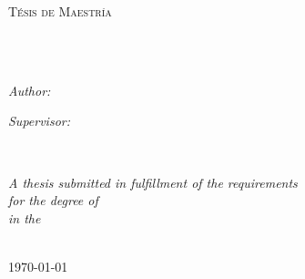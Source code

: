 \documentclass[
12pt, %
english, %
singlespacing, %
headsepline, %
]{MastersDoctoralThesis} %
\author{Sebastian \textsc{Carmona Estrada}} %
\begin{document}
\frontmatter %

\pagestyle{plain} %


\begin{titlepage}
\begin{center}

\vspace*{.06\textheight}
{\scshape\LARGE \univname\par}\vspace{1.5cm} %
\textsc{\Large Tésis de Maestría}\\[0.5cm] %

\HRule \\[0.4cm] %
{\huge \bfseries \ttitle\par}\vspace{0.4cm} %
\HRule \\[1.5cm] %
 
\begin{minipage}[t]{0.4\textwidth}
\begin{flushleft} \large
\emph{Author:}\\
\href{scarmonae@eafit.edu.co}{\authorname} %
\end{flushleft}
\end{minipage}
\begin{minipage}[t]{0.4\textwidth}
\begin{flushright} \large
\emph{Supervisor:} \\
\href{olquinte1@eafit.edu.co}{\supname} %
\end{flushright}
\end{minipage}\\[3cm]
 
\vfill

\large \textit{A thesis submitted in fulfillment of the requirements\\ for the degree of \degreename}\\[0.3cm] %
\textit{in the}\\[0.4cm]
\deptname\\[2cm] %
 
\vfill

{\large \today}\\[4cm] %
 
\vfill
\end{center}
\end{titlepage}
\end{document}
